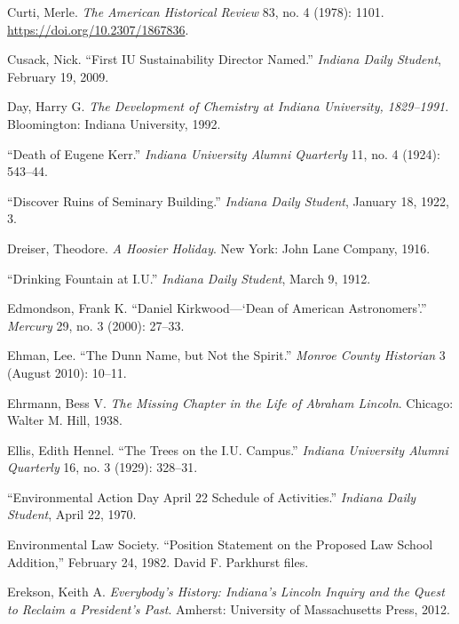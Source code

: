 \documentclass[
  american,
  letterpaper,
]{scrreprt}
\newlength{\cslhangindent}
\newenvironment{CSLReferences}[2] %
 {\begin{list}{}{%
  \setlength{\itemindent}{0pt}
  \setlength{\leftmargin}{0pt}
  \setlength{\parsep}{0pt}
  \ifodd #1
   \setlength{\leftmargin}{\cslhangindent}
   \setlength{\itemindent}{-1\cslhangindent}
  \fi
  \setlength{\itemsep}{#2\baselineskip}}}
 {\end{list}}
\begin{document}
\begin{CSLReferences}{1}{0}
Curti, Merle. \emph{The American Historical Review} 83, no. 4 (1978):
1101. \url{https://doi.org/10.2307/1867836}.

Cusack, Nick. {``First IU Sustainability Director Named.''}
\emph{Indiana Daily Student}, February 19, 2009.

Day, Harry G. \emph{The Development of Chemistry at Indiana University,
1829--1991}. Bloomington: Indiana University, 1992.

{``Death of Eugene Kerr.''} \emph{Indiana University Alumni Quarterly}
11, no. 4 (1924): 543--44.

{``Discover Ruins of Seminary Building.''} \emph{Indiana Daily Student},
January 18, 1922, 3.

Dreiser, Theodore. \emph{A Hoosier Holiday}. New York: John Lane
Company, 1916.

{``Drinking Fountain at {I.U.}''} \emph{Indiana Daily Student}, March 9,
1912.

Edmondson, Frank K. {``{Daniel Kirkwood---{`}Dean of American
Astronomers{'}}.''} \emph{Mercury} 29, no. 3 (2000): 27--33.

Ehman, Lee. {``The Dunn Name, but Not the Spirit.''} \emph{Monroe County
Historian} 3 (August 2010): 10--11.

Ehrmann, Bess V. \emph{The Missing Chapter in the Life of Abraham
Lincoln}. Chicago: Walter M. Hill, 1938.

Ellis, Edith Hennel. {``{The Trees on the I.U. Campus}.''} \emph{Indiana
University Alumni Quarterly} 16, no. 3 (1929): 328--31.

{``Environmental Action Day April 22 Schedule of Activities.''}
\emph{Indiana Daily Student}, April 22, 1970.

Environmental Law Society. {``Position Statement on the Proposed Law
School Addition,''} February 24, 1982. David F. Parkhurst files.

Erekson, Keith A. \emph{Everybody's History: Indiana's Lincoln Inquiry
and the Quest to Reclaim a President's Past}. Amherst: University of
Massachusetts Press, 2012.


\end{CSLReferences}
\end{document}

